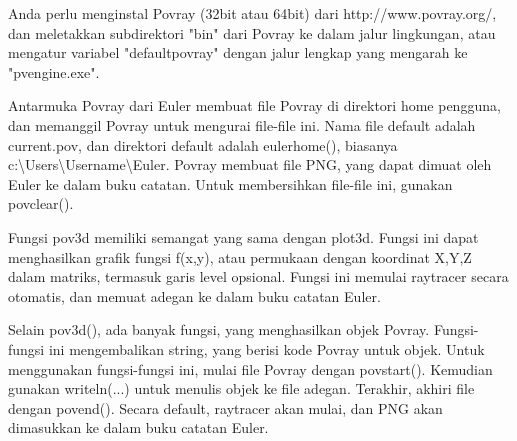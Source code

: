 \documentclass[a4paper,10pt]{article}
\begin{document}
\begin{eulernotebook}
\begin{eulercomment}
\begin{eulercomment}
\begin{eulercomment}
\begin{eulercomment}
\begin{eulercomment}
\begin{eulercomment}
\begin{eulercomment}
\begin{eulercomment}
\begin{eulercomment}
\begin{eulercomment}
\begin{eulercomment}
\begin{eulercomment}
\begin{eulercomment}
\begin{eulercomment}
\begin{eulercomment}
\begin{eulercomment}
\begin{eulercomment}
\begin{eulercomment}
\begin{eulercomment}
\begin{eulercomment}
\begin{eulercomment}
\begin{eulercomment}
\begin{eulercomment}
\begin{eulercomment}
\begin{eulercomment}
\begin{eulercomment}
\begin{eulercomment}
\begin{eulercomment}
\begin{eulercomment}
\begin{eulercomment}
\begin{eulercomment}
\begin{eulercomment}
\begin{eulercomment}
\begin{eulercomment}
\begin{eulercomment}
\begin{eulercomment}
\begin{eulercomment}
\begin{eulercomment}
\begin{eulercomment}
\begin{eulercomment}
\begin{eulercomment}
Anda perlu menginstal Povray (32bit atau 64bit) dari
http://www.povray.org/, dan meletakkan subdirektori "bin" dari Povray ke dalam jalur lingkungan, atau mengatur variabel "defaultpovray" dengan jalur lengkap yang mengarah ke "pvengine.exe".

Antarmuka Povray dari Euler membuat file Povray di direktori home
pengguna, dan memanggil Povray untuk mengurai file-file ini. Nama file
default adalah current.pov, dan direktori default adalah eulerhome(),
biasanya c:\textbackslash{}Users\textbackslash{}Username\textbackslash{}Euler. Povray membuat file PNG, yang dapat
dimuat oleh Euler ke dalam buku catatan. Untuk membersihkan file-file
ini, gunakan povclear().

Fungsi pov3d memiliki semangat yang sama dengan plot3d. Fungsi ini
dapat menghasilkan grafik fungsi f(x,y), atau permukaan dengan
koordinat X,Y,Z dalam matriks, termasuk garis level opsional. Fungsi
ini memulai raytracer secara otomatis, dan memuat adegan ke dalam buku
catatan Euler.

Selain pov3d(), ada banyak fungsi, yang menghasilkan objek Povray.
Fungsi-fungsi ini mengembalikan string, yang berisi kode Povray untuk
objek. Untuk menggunakan fungsi-fungsi ini, mulai file Povray dengan
povstart(). Kemudian gunakan writeln(...) untuk menulis objek ke file
adegan. Terakhir, akhiri file dengan povend(). Secara default,
raytracer akan mulai, dan PNG akan dimasukkan ke dalam buku catatan
Euler.


\end{eulercomment}
\end{eulercomment}
\end{eulercomment}
\end{eulercomment}
\end{eulercomment}
\end{eulercomment}
\end{eulercomment}
\end{eulercomment}
\end{eulercomment}
\end{eulercomment}
\end{eulercomment}
\end{eulercomment}
\end{eulercomment}
\end{eulercomment}
\end{eulercomment}
\end{eulercomment}
\end{eulercomment}
\end{eulercomment}
\end{eulercomment}
\end{eulercomment}
\end{eulercomment}
\end{eulercomment}
\end{eulercomment}
\end{eulercomment}
\end{eulercomment}
\end{eulercomment}
\end{eulercomment}
\end{eulercomment}
\end{eulercomment}
\end{eulercomment}
\end{eulercomment}
\end{eulercomment}
\end{eulercomment}
\end{eulercomment}
\end{eulercomment}
\end{eulercomment}
\end{eulercomment}
\end{eulercomment}
\end{eulercomment}
\end{eulercomment}
\end{eulercomment}
\end{eulernotebook}
\end{document}
